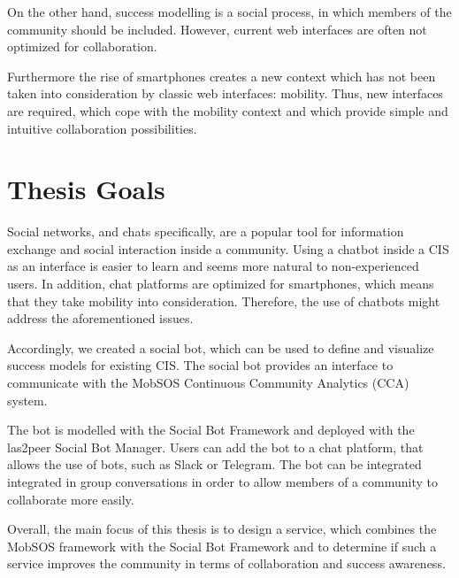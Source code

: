 On the other hand, success modelling is a social process, in which members of the community should be included. However, current web interfaces are often not optimized for collaboration.

Furthermore the rise of smartphones creates a new context which has not been taken into consideration by classic web interfaces: mobility.
Thus, new interfaces are required, which cope with the mobility context and which provide simple and intuitive collaboration possibilities.

\section{Thesis Goals}

Social networks, and chats specifically, are a popular tool for information exchange and social interaction inside a community.
Using a chatbot inside a CIS as an interface is easier to learn and seems more natural to non-experienced users.
In addition, chat platforms are optimized for smartphones, which means that they take mobility into consideration. Therefore, the use of chatbots might address the aforementioned issues.

Accordingly, we created a social bot, which can be used to define and visualize success models for existing CIS. The social bot provides an interface to communicate with the MobSOS Continuous Community Analytics (CCA) system.

The bot is modelled with the Social Bot Framework and deployed with the las2peer Social Bot Manager. Users can add the bot to a chat platform, that allows the use of bots, such as Slack or Telegram.
The bot can be integrated integrated in group conversations in order to allow members of a community to collaborate more easily.

Overall, the main focus of this thesis is to design a service, which combines the MobSOS framework with the Social Bot Framework and to determine if such a service improves the community in terms of collaboration and success awareness.